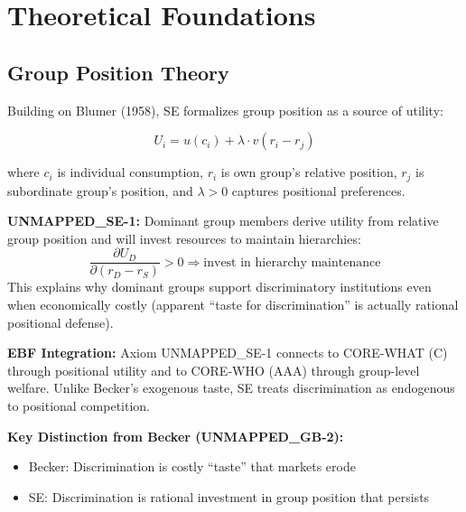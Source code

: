 \section{Theoretical Foundations}
\label{sec:se-theory}

\subsection{Group Position Theory}
\label{subsec:se-group-position}

Building on Blumer (1958), SE formalizes group position as a source of utility:

\begin{equation}
U_i = u(c_i) + \lambda \cdot v(r_i - r_j)
\label{eq:se-position}
\end{equation}

where $c_i$ is individual consumption, $r_i$ is own group's relative position, $r_j$ is subordinate group's position, and $\lambda > 0$ captures positional preferences.

\begin{axiom}
\label{ax:se-1}
\textbf{UNMAPPED_SE-1:} Dominant group members derive utility from relative group position and will invest resources to maintain hierarchies:
\begin{equation}
\frac{\partial U_D}{\partial (r_D - r_S)} > 0 \Rightarrow \text{invest in hierarchy maintenance}
\end{equation}
This explains why dominant groups support discriminatory institutions even when economically costly (apparent ``taste for discrimination'' is actually rational positional defense).
\end{axiom}

\textbf{EBF Integration:} Axiom UNMAPPED_SE-1 connects to CORE-WHAT (C) through positional utility and to CORE-WHO (AAA) through group-level welfare. Unlike Becker's exogenous taste, SE treats discrimination as endogenous to positional competition.

\textbf{Key Distinction from Becker (UNMAPPED_GB-2):}
\begin{itemize}
    \item Becker: Discrimination is costly ``taste'' that markets erode
    \item SE: Discrimination is rational investment in group position that persists
\end{itemize}

